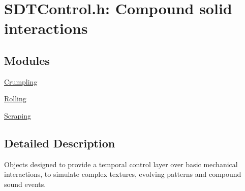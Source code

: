 \hypertarget{group__control}{}\section{S\+D\+T\+Control.\+h\+: Compound solid interactions}
\label{group__control}
\subsection*{Modules}
\begin{DoxyCompactItemize}
\item 
\hyperlink{group__crumpling}{Crumpling}
\item 
\hyperlink{group__rolling}{Rolling}
\item 
\hyperlink{group__scraping}{Scraping}
\end{DoxyCompactItemize}


\subsection{Detailed Description}
Objects designed to provide a temporal control layer over basic mechanical interactions, to simulate complex textures, evolving patterns and compound sound events. 